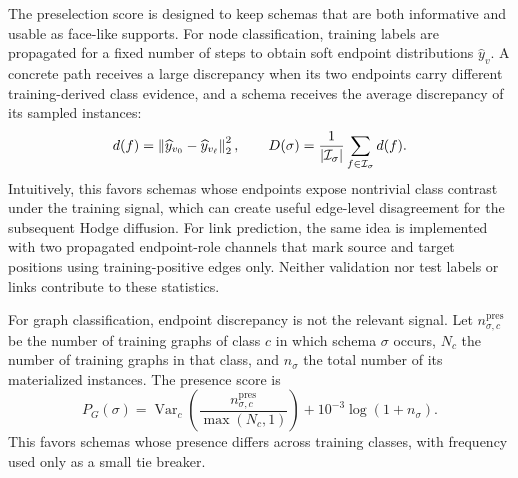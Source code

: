 The preselection score is designed to keep schemas that are both informative and usable as
face-like supports.  For node classification, training labels are propagated for a fixed number of
steps to obtain soft endpoint distributions \(\widehat y_v\).  A concrete path receives a large
discrepancy when its two endpoints carry different training-derived class evidence, and a schema
receives the average discrepancy of its sampled instances:
\begin{equation}
  d(f)=\left\lVert \widehat y_{v_0}-\widehat y_{v_\ell}\right\rVert_2^2,
  \qquad
  D(\sigma)=\frac{1}{|\mathcal{I}_{\sigma}|}
  \sum_{f\in\mathcal{I}_{\sigma}}d(f).
  \label{eq:discrepancy}
\end{equation}
Intuitively, this favors schemas whose endpoints expose nontrivial class contrast under the
training signal, which can create useful edge-level disagreement for the subsequent Hodge diffusion.
For link prediction, the same idea is implemented with two propagated endpoint-role channels that
mark source and target positions using training-positive edges only.  Neither validation nor test
labels or links contribute to these statistics.

For graph classification, endpoint discrepancy is not the relevant signal.  Let
\(n_{\sigma,c}^{\mathrm{pres}}\) be the number of training graphs of class \(c\) in which schema
\(\sigma\) occurs, \(N_c\) the number of training graphs in that class, and \(n_\sigma\) the total
number of its materialized instances.  The presence score is
\begin{equation}
  P_G(\sigma)
  =\operatorname{Var}_{c}\!\left(
    \frac{n_{\sigma,c}^{\mathrm{pres}}}{\max(N_c,1)}
  \right)+10^{-3}\log(1+n_\sigma).
  \label{eq:graph-presence-score}
\end{equation}
This favors schemas whose presence differs across training classes, with frequency used only as a
small tie breaker.


